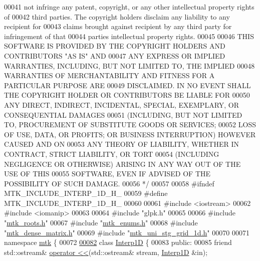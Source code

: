 \begin{DoxyCode}
00041 \textcolor{comment}{not infringe any patent, copyright, or any other intellectual property rights of}
00042 \textcolor{comment}{third parties. The copyright holders disclaim any liability to any recipient for}
00043 \textcolor{comment}{claims brought against recipient by any third party for infringement of that}
00044 \textcolor{comment}{parties intellectual property rights.}
00045 \textcolor{comment}{}
00046 \textcolor{comment}{THIS SOFTWARE IS PROVIDED BY THE COPYRIGHT HOLDERS AND CONTRIBUTORS "AS IS" AND}
00047 \textcolor{comment}{ANY EXPRESS OR IMPLIED WARRANTIES, INCLUDING, BUT NOT LIMITED TO, THE IMPLIED}
00048 \textcolor{comment}{WARRANTIES OF MERCHANTABILITY AND FITNESS FOR A PARTICULAR PURPOSE ARE}
00049 \textcolor{comment}{DISCLAIMED. IN NO EVENT SHALL THE COPYRIGHT HOLDER OR CONTRIBUTORS BE LIABLE FOR}
00050 \textcolor{comment}{ANY DIRECT, INDIRECT, INCIDENTAL, SPECIAL, EXEMPLARY, OR CONSEQUENTIAL DAMAGES}
00051 \textcolor{comment}{(INCLUDING, BUT NOT LIMITED TO, PROCUREMENT OF SUBSTITUTE GOODS OR SERVICES;}
00052 \textcolor{comment}{LOSS OF USE, DATA, OR PROFITS; OR BUSINESS INTERRUPTION) HOWEVER CAUSED AND ON}
00053 \textcolor{comment}{ANY THEORY OF LIABILITY, WHETHER IN CONTRACT, STRICT LIABILITY, OR TORT}
00054 \textcolor{comment}{(INCLUDING NEGLIGENCE OR OTHERWISE) ARISING IN ANY WAY OUT OF THE USE OF THIS}
00055 \textcolor{comment}{SOFTWARE, EVEN IF ADVISED OF THE POSSIBILITY OF SUCH DAMAGE.}
00056 \textcolor{comment}{*/}
00057 
00058 \textcolor{preprocessor}{#ifndef MTK\_INCLUDE\_INTERP\_1D\_H\_}
00059 \textcolor{preprocessor}{#define MTK\_INCLUDE\_INTERP\_1D\_H\_}
00060 
00061 \textcolor{preprocessor}{#include <iostream>}
00062 \textcolor{preprocessor}{#include <iomanip>}
00063 
00064 \textcolor{preprocessor}{#include "glpk.h"}
00065 
00066 \textcolor{preprocessor}{#include "\hyperlink{mtk__roots_8h}{mtk\_roots.h}"}
00067 \textcolor{preprocessor}{#include "\hyperlink{mtk__enums_8h}{mtk\_enums.h}"}
00068 \textcolor{preprocessor}{#include "\hyperlink{mtk__dense__matrix_8h}{mtk\_dense\_matrix.h}"}
00069 \textcolor{preprocessor}{#include "\hyperlink{mtk__uni__stg__grid__1d_8h}{mtk\_uni\_stg\_grid\_1d.h}"}
00070 
00071 \textcolor{keyword}{namespace }\hyperlink{namespacemtk}{mtk} \{
00072 
\hypertarget{mtk__interp__1d_8h_source_l00082}{}\hyperlink{classmtk_1_1Interp1D}{00082} \textcolor{keyword}{class }\hyperlink{classmtk_1_1Interp1D}{Interp1D} \{
00083  \textcolor{keyword}{public}:
00085   \textcolor{keyword}{friend} std::ostream& \hyperlink{classmtk_1_1Interp1D_a6e54e703f239df8e5db192638ac86686}{operator <<}(std::ostream& stream, \hyperlink{classmtk_1_1Interp1D}{Interp1D} &in);

\end{DoxyCode}
